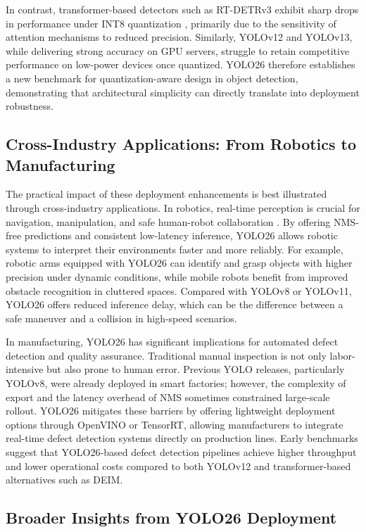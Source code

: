 \documentclass{article}
\begin{document}
In contrast, transformer-based detectors such as RT-DETRv3 exhibit sharp drops in performance under INT8 quantization \cite{wang2025rt}, primarily due to the sensitivity of attention mechanisms to reduced precision. Similarly, YOLOv12 and YOLOv13, while delivering strong accuracy on GPU servers, struggle to retain competitive performance on low-power devices once quantized. YOLO26 therefore establishes a new benchmark for quantization-aware design in object detection, demonstrating that architectural simplicity can directly translate into deployment robustness.

\subsection{Cross-Industry Applications: From Robotics to Manufacturing}

The practical impact of these deployment enhancements is best illustrated through cross-industry applications. In robotics, real-time perception is crucial for navigation, manipulation, and safe human-robot collaboration \cite{bonci2021human, SAPKOTA2026103575}. By offering NMS-free predictions and consistent low-latency inference, YOLO26 allows robotic systems to interpret their environments faster and more reliably. For example, robotic arms equipped with YOLO26 can identify and grasp objects with higher precision under dynamic conditions, while mobile robots benefit from improved obstacle recognition in cluttered spaces. Compared with YOLOv8 or YOLOv11, YOLO26 offers reduced inference delay, which can be the difference between a safe maneuver and a collision in high-speed scenarios.

In manufacturing, YOLO26 has significant implications for automated defect detection and quality assurance. Traditional manual inspection is not only labor-intensive but also prone to human error. Previous YOLO releases, particularly YOLOv8, were already deployed in smart factories; however, the complexity of export and the latency overhead of NMS sometimes constrained large-scale rollout. YOLO26 mitigates these barriers by offering lightweight deployment options through OpenVINO or TensorRT, allowing manufacturers to integrate real-time defect detection systems directly on production lines. Early benchmarks suggest that YOLO26-based defect detection pipelines achieve higher throughput and lower operational costs compared to both YOLOv12 and transformer-based alternatives such as DEIM.

\subsection{Broader Insights from YOLO26 Deployment}
\end{document}
